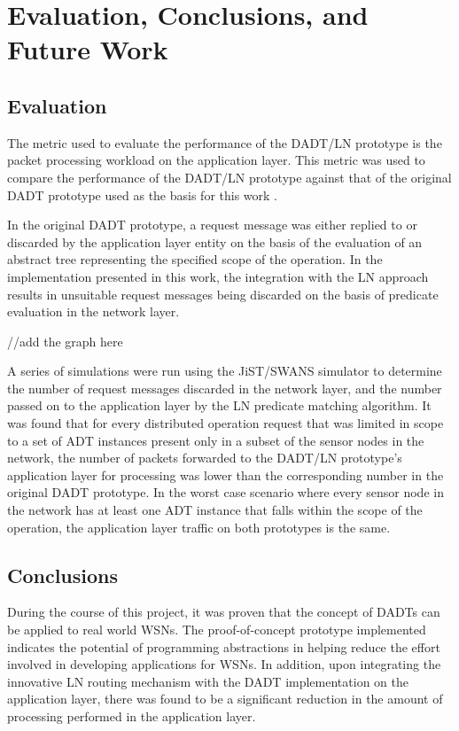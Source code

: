 \chapter{Evaluation, Conclusions, and Future Work} \label{chap: Evaluation}
 \section{Evaluation}

The metric used to evaluate the performance of the DADT/LN prototype is
the packet processing workload on the application layer. This metric was used to
compare the performance of the DADT/LN prototype against that of the original
DADT prototype used as the basis for this work \cite{migliavacca_DADT:2006}. 

In the original DADT prototype, a request message
was either replied to or discarded by the application layer entity on the basis of the
evaluation of an abstract tree representing the specified scope of the operation. In
the implementation presented in this work, the integration with the LN approach
results in unsuitable request messages being discarded on the basis of predicate
evaluation in the network layer.

//add the graph here

A series of simulations were run using the JiST/SWANS simulator to determine
the number of request messages discarded in the network layer, and the number
passed on to the application layer by the LN predicate matching algorithm. 
It was found that for every distributed operation request that was limited in
scope to a set of ADT instances present only in a subset of the sensor nodes in
the network, the number of packets forwarded to the DADT/LN prototype's
application layer for processing was lower than the corresponding number in the
original DADT prototype. In the worst case scenario where every sensor node in
the network has at least one ADT instance that falls within the scope of the
operation, the application layer traffic on both prototypes is the same.

\section{Conclusions}

During the course of this project, it was proven that the concept of DADTs can be
applied to real world WSNs. The proof-of-concept prototype implemented indicates
the potential of programming abstractions in helping reduce the effort involved
in developing applications for WSNs.
In addition, upon integrating the innovative LN routing mechanism
with the DADT implementation on the application layer, there was found to be a
significant reduction in the amount of processing performed in the application
layer. 
 
